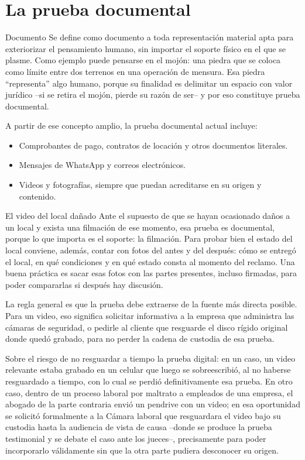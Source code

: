 \documentclass[12pt,oneside]{book}
\begin{document}
\section{La prueba documental}

\begin{definition}{Documento}
Se define como documento a toda representación material apta para exteriorizar el pensamiento humano, sin importar el soporte físico en el que se plasme. Como ejemplo puede pensarse en el mojón: una piedra que se coloca como límite entre dos terrenos en una operación de mensura. Esa piedra ``representa'' algo humano, porque su finalidad es delimitar un espacio con valor jurídico --si se retira el mojón, pierde su razón de ser-- y por eso constituye prueba documental.
\end{definition}

A partir de ese concepto amplio, la prueba documental actual incluye:
\begin{itemize}
    \item Comprobantes de pago, contratos de locación y otros documentos literales.
    \item Mensajes de WhatsApp y correos electrónicos.
    \item Videos y fotografías, siempre que puedan acreditarse en su origen y contenido.
\end{itemize}

\begin{example}{El video del local dañado}
Ante el supuesto de que se hayan ocasionado daños a un local y exista una filmación de ese momento, esa prueba es documental, porque lo que importa es el soporte: la filmación. Para probar bien el estado del local conviene, además, contar con fotos del antes y del después: cómo se entregó el local, en qué condiciones y en qué estado consta al momento del reclamo. Una buena práctica es sacar esas fotos con las partes presentes, incluso firmadas, para poder compararlas si después hay discusión.
\end{example}

La regla general es que la prueba debe extraerse de la fuente más directa posible. Para un video, eso significa solicitar informativa a la empresa que administra las cámaras de seguridad, o pedirle al cliente que resguarde el disco rígido original donde quedó grabado, para no perder la cadena de custodia de esa prueba.

\begin{note}
Sobre el riesgo de no resguardar a tiempo la prueba digital: en un caso, un video relevante estaba grabado en un celular que luego se sobreescribió, al no haberse resguardado a tiempo, con lo cual se perdió definitivamente esa prueba. En otro caso, dentro de un proceso laboral por maltrato a empleados de una empresa, el abogado de la parte contraria envió un pendrive con un video; en esa oportunidad se solicitó formalmente a la Cámara laboral que resguardara el video bajo su custodia hasta la audiencia de vista de causa --donde se produce la prueba testimonial y se debate el caso ante los jueces--, precisamente para poder incorporarlo válidamente sin que la otra parte pudiera desconocer su origen.
\end{note}
\end{document}
